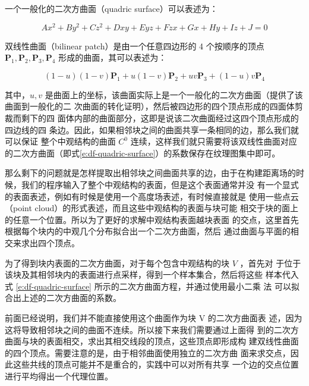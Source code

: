 一个一般化的二次方曲面（quadric surface）可以表述为：

\begin{equation}\label{e:df-quadric-surface}
	Ax^{2}+By^{2}+Cz^{2}+Dxy+Eyz+Fzx+Gx+Hy+Iz+J=0
\end{equation}


双线性曲面（bilinear patch）是由一个任意四边形的 4 个按顺序的顶点$\mathbf{P}_1, \mathbf{P}_2, \mathbf{P}_3, \mathbf{P}_4$ 形成的曲面，其可以表述为：

\begin{equation}
	(1-u)(1-v)\mathbf{P}_1+u(1-v)\mathbf{P}_2+uv\mathbf{P}_3+(1-u)v\mathbf{P}_4
\end{equation}

\noindent 其中，$u, v$ 是曲面上的坐标，该曲面实际上是一个一般化的二次方曲面（\cite{a:Accurateandconsistentreconstructionofilluminationfunctionsusingstructuredsampling,a:Incrementalraycastingofpiecewisequadraticsurfacesonthegpu}提供了该曲面到一般化的二 次曲面的转化证明），然后被四边形的四个顶点形成的四面体剪裁而剩下的四 面体内部的曲面部分，这即是说该二次曲面经过这四个顶点形成的四边线的四 条边。因此，如果相邻块之间的曲面共享一条相同的边，那么我们就可以保证 整个中观结构的曲面 $C^{0}$ 连续，这样我们就只需要将该双线性曲面对应的二次方曲面（即式\ref{e:df-quadric-surface}）的系数保存在纹理图集中即可。 

那么剩下的问题就是怎样提取出相邻块之间曲面共享的边，由于在构建距离场的时候，我们的程序输入了整个中观结构的表面，但是这个表面通常并没 有一个显式的表面表述，例如有时候是使用一个高度场表述，有时候直接就是 使用一些点云（point cloud）的形式表述，而且这些中观结构的表面与块可能 相交于块的面上的任意一个位置。所以为了更好的求解中观结构表面越块表面 的交点，这里首先根据每个块内的中观几个分布拟合出一个二次方曲面，然后 通过曲面与平面的相交来求出四个顶点。

为了得到块内表面的二次方曲面，对于每个包含中观结构的块 $V$ ，首先对 于位于该块及其相邻块内的表面进行点采样，得到一个样本集合，然后将这些 样本代入式 \ref{e:df-quadric-surface} 所示的二次方曲面方程，并通过使用最小二乘 法 \cite{a:Geometricpropertyestimationfrom3drangedatapointsaidedbylocalquadricsurfacefitting} 可以拟合出上述的二次方曲面的系数。

前面已经说明，我们并不能直接使用这个曲面作为块 V 的二次方曲面表 述，因为这将导致相邻块之间的曲面不连续。所以接下来我们需要通过上面得 到的二次方曲面与块的表面相交，求出其相交线段的顶点，这些顶点即形成构 建双线性曲面的四个顶点。需要注意的是，由于相邻曲面使用独立的二次方曲 面来求交点，因此这些共线的顶点可能并不是重合的，实践中可以对所有共享 一个边的交点位置进行平均得出一个代理位置。

